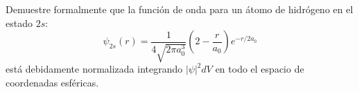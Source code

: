 \item Demuestre formalmente que la función de onda para un átomo de hidrógeno en el estado $2s$:
$$ \psi_{2s}(r) = \frac{1}{4\sqrt{2\pi a_0^3}} \left( 2 - \frac{r}{a_0} \right) e^{-r/2a_0} $$
está debidamente normalizada integrando $\left|\psi\right|^2 dV$ en todo el espacio de coordenadas esféricas.